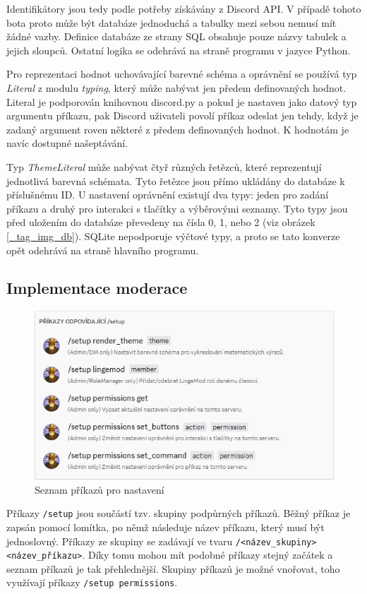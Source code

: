 \documentclass[FM]{tulthesis}
\begin{document}
	Identifikátory jsou tedy podle potřeby získávány z Discord API. V případě tohoto bota proto může být databáze jednoduchá a tabulky mezi sebou nemusí mít žádné vazby. Definice databáze ze strany SQL obsahuje pouze názvy tabulek a jejich sloupců. Ostatní logika se odehrává na straně programu v jazyce Python.
	
	Pro reprezentaci hodnot uchovávající barevné schéma a oprávnění se používá typ \textit{Literal} z modulu \textit{typing}, který může nabývat jen předem definovaných hodnot. Literal je podporován knihovnou discord.py a pokud je nastaven jako datový typ argumentu příkazu, pak Discord uživateli povolí příkaz odeslat jen tehdy, když je zadaný argument roven některé z předem definovaných hodnot. K hodnotám je navíc dostupné našeptávání.
	
	Typ \textit{ThemeLiteral} může nabývat čtyř různých řetězců, které reprezentují jednotlivá barevná schémata. Tyto řetězce jsou přímo ukládány do databáze k příslušnému ID. U nastavení oprávnění existují dva typy: jeden pro zadání příkazu a druhý pro interakci s tlačítky a výběrovými seznamy. Tyto typy jsou před uložením do databáze převedeny na čísla 0, 1, nebo 2 (viz obrázek \ref{_tag_img_db}). SQLite nepodporuje výčtové typy, a proto se tato konverze opět odehrává na straně hlavního programu.
	
	\subsection{Implementace moderace}
	
	\begin{figure}[ht]
		\centering
		\includegraphics[width=\textwidth]{img/SetupCommands}
		\caption{Seznam příkazů pro nastavení}
	\end{figure}
	
	Příkazy \verb|/setup| jsou součástí tzv. skupiny podpůrných příkazů. Běžný příkaz je zapsán pomocí lomítka, po němž následuje název příkazu, který musí být jednoslovný. Příkazy ze skupiny se zadávají ve tvaru \verb|/<název_skupiny> <název_příkazu>|. Díky tomu mohou mít podobné příkazy stejný začátek a seznam příkazů je tak přehlednější. Skupiny příkazů je možné vnořovat, toho využívají příkazy \verb|/setup permissions|.
	
\end{document}
